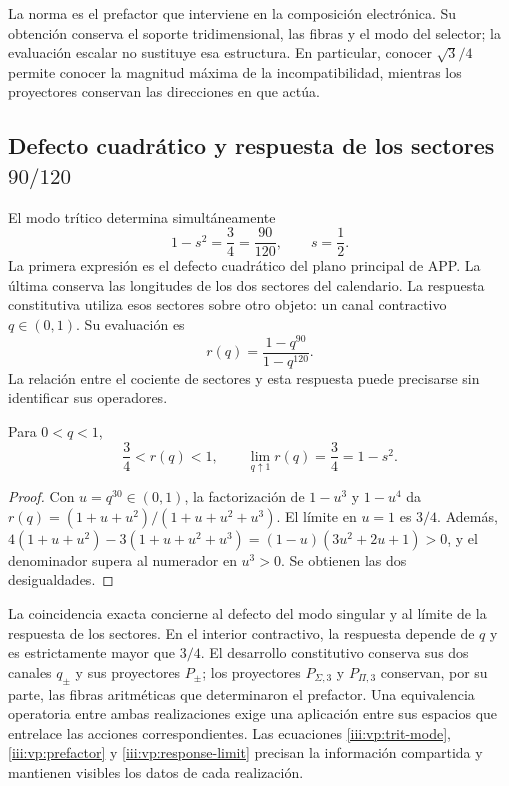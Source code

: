 La norma es el prefactor que interviene en la composición electrónica.
Su obtención conserva el soporte tridimensional, las fibras y el modo
del selector; la evaluación escalar no sustituye esa estructura. En
particular, conocer $\sqrt3/4$ permite conocer la magnitud máxima de
la incompatibilidad, mientras los proyectores conservan las direcciones
en que actúa.

\clearpage
\subsection{Defecto cuadrático y respuesta de los sectores \(90/120\)}

El modo trítico determina simultáneamente
\begin{equation}
 1-s^2=\frac34=\frac{90}{120},\qquad s=\frac12.
 \label{iii:vp:defect-ratio}
\end{equation}
La primera expresión es el defecto cuadrático del plano principal de APP.
La última conserva las longitudes de los dos sectores del calendario.
La respuesta constitutiva utiliza esos sectores sobre otro objeto: un
canal contractivo $q\in(0,1)$. Su evaluación es
\[
 r(q)=\frac{1-q^{90}}{1-q^{120}}.
\]
La relación entre el cociente de sectores y esta respuesta puede
precisarse sin identificar sus operadores.

\begin{proposition}
Para $0<q<1$,
\begin{equation}
 \frac34<r(q)<1,\qquad
 \lim_{q\uparrow1}r(q)=\frac34=1-s^2.
 \label{iii:vp:response-limit}
\end{equation}
\end{proposition}
\begin{proof}
Con $u=q^{30}\in(0,1)$, la factorización de $1-u^3$ y
$1-u^4$ da
$r(q)=(1+u+u^2)/(1+u+u^2+u^3)$. El límite en $u=1$ es
$3/4$. Además,
$4(1+u+u^2)-3(1+u+u^2+u^3)
=(1-u)(3u^2+2u+1)>0$, y el denominador supera al numerador
en $u^3>0$. Se obtienen las dos desigualdades.
\end{proof}

La coincidencia exacta concierne al defecto del modo singular y al límite
de la respuesta de los sectores. En el interior contractivo, la respuesta
depende de $q$ y es estrictamente mayor que $3/4$. El desarrollo
constitutivo conserva sus dos canales $q_\pm$ y sus proyectores
$P_\pm$; los proyectores $P_{\Sigma,3}$ y $P_{\Pi,3}$ conservan,
por su parte, las fibras aritméticas que determinaron el prefactor.
Una equivalencia operatoria entre ambas realizaciones exige una aplicación
entre sus espacios que entrelace las acciones correspondientes.
Las ecuaciones \eqref{iii:vp:trit-mode}, \eqref{iii:vp:prefactor} y
\eqref{iii:vp:response-limit} precisan la información compartida y
mantienen visibles los datos de cada realización.
